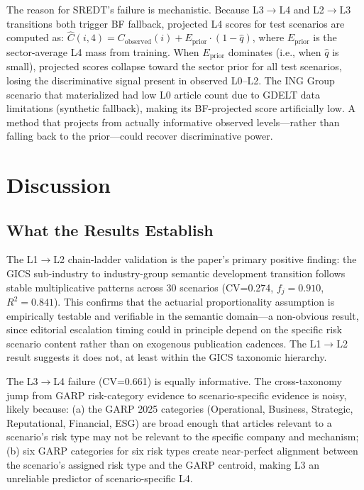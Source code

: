 \documentclass[11pt,letterpaper]{article}
\begin{document}
The reason for SREDT's failure is mechanistic. Because L3$\to$L4 and L2$\to$L3 transitions both trigger BF fallback, projected L4 scores for test scenarios are computed as: $\hat{C}(i, 4) = C_\text{observed}(i) + E_\text{prior} \cdot (1-\hat{q})$, where $E_\text{prior}$ is the sector-average L4 mass from training. When $E_\text{prior}$ dominates (i.e., when $\hat{q}$ is small), projected scores collapse toward the sector prior for all test scenarios, losing the discriminative signal present in observed L0--L2. The ING Group scenario that materialized had low L0 article count due to GDELT data limitations (synthetic fallback), making its BF-projected score artificially low. A method that projects from actually informative observed levels---rather than falling back to the prior---could recover discriminative power.

\section{Discussion}

\subsection{What the Results Establish}

The L1$\to$L2 chain-ladder validation is the paper's primary positive finding: the GICS sub-industry to industry-group semantic development transition follows stable multiplicative patterns across 30 scenarios (CV=0.274, $f_j=0.910$, $R^2=0.841$). This confirms that the actuarial proportionality assumption is empirically testable and verifiable in the semantic domain---a non-obvious result, since editorial escalation timing could in principle depend on the specific risk scenario content rather than on exogenous publication cadences. The L1$\to$L2 result suggests it does not, at least within the GICS taxonomic hierarchy.

The L3$\to$L4 failure (CV=0.661) is equally informative. The cross-taxonomy jump from GARP risk-category evidence to scenario-specific evidence is noisy, likely because: (a) the GARP 2025 categories (Operational, Business, Strategic, Reputational, Financial, ESG) are broad enough that articles relevant to a scenario's risk type may not be relevant to the specific company and mechanism; (b) six GARP categories for six risk types create near-perfect alignment between the scenario's assigned risk type and the GARP centroid, making L3 an unreliable predictor of scenario-specific L4.
\end{document}
